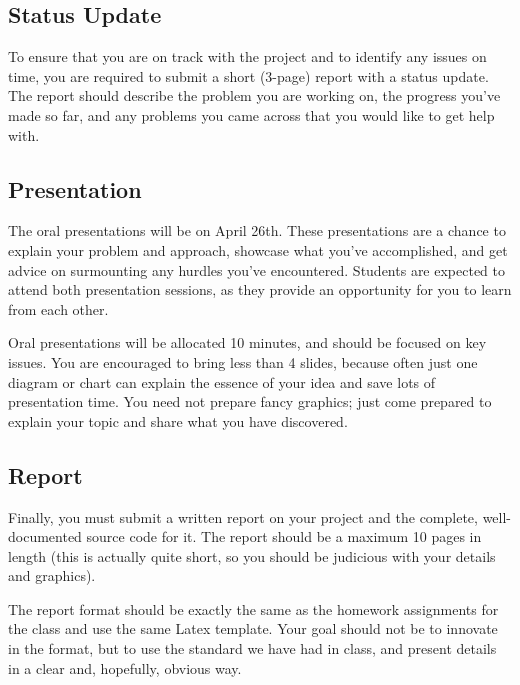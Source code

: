 \documentclass[11pt]{article}
\begin{document}
\subsection{Status Update}

To ensure that you are on track with the project and to identify any
issues on time, you are required to submit a short (3-page) report
with a status update. The report should describe the problem you are
working on, the progress you've made so far, and any problems you came
across that you would like to get help with. 

\subsection{Presentation}

The oral presentations will be on April 26th. These presentations are
a chance to explain your problem and approach, showcase what you've
accomplished, and get advice on surmounting any hurdles you've
encountered. Students are expected to attend both presentation
sessions, as they provide an opportunity for you to learn from each
other.


Oral presentations will be allocated 10 minutes, and should be
focused on key issues. You are encouraged to bring less than 4
slides, because often just one diagram or chart can explain the
essence of your idea and save lots of presentation time. You need
not prepare fancy graphics; just come prepared to explain your topic
and share what you have discovered.


\subsection{Report}

Finally, you must submit a written report on your project and the complete,
well-documented source code for it. The report should be a maximum 10
pages in length (this is actually quite short, so you should be judicious 
with your details and graphics).

The report format should be exactly the same as the homework
assignments for the class and use the same Latex template. Your 
goal should not be to innovate in the format, but to use the 
standard we have had in class, and present details in a clear 
and, hopefully, obvious way. 
\end{document}
